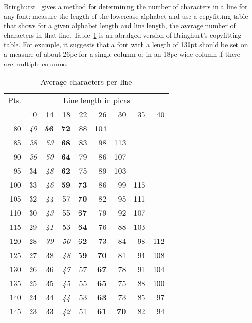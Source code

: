 \documentclass[10pt,letterpaper]{memoir}
\begin{document}
    Bringhurst~\cite{BRINGHURST92} gives a method for determining the number
of characters in a line for any font: 
measure the length of the lowercase
alphabet and use a copyfitting 
table that shows for a given alphabet 
length and line length, the average number of characters in that line.
 Table~\ref{tab:copyfitting} is an
abridged version of Bringhurt's copyfitting table.
For example, it suggests that a font with a length of 130pt should be
set on a measure of about 26pc for a single column or in an 18pc wide
column if there are multiple columns.
 

\begin{table}
\DeleteShortVerb{\|}
\centering
\caption{Average characters per line} \label{tab:copyfitting}
\begin{tabular}{r|rrrrrrrr} \hline
Pts. & \multicolumn{8}{c}{Line length in picas} \\
     & 10 & 14 & 18 & 22 & 26  & 30  & 35 & 40 \\ \hline
80   & \textit{40} & \textbf{56} & \textbf{72} & 88 & 104 &     &    &    \\
85   & \textit{38} & \textit{53} & \textbf{68} & 83 & 98 & 113 &    &    \\
90   & \textit{36} & \textit{50} & \textbf{64} & 79 & 86 & 107 &    &    \\
95   & 34 & \textit{48} & \textbf{62} & 75 & 89 & 103 &    &    \\
100  & 33 & \textit{46} & \textbf{59} & \textbf{73} & 86 & 99 & 116 &   \\
105  & 32 & \textit{44} & 57 & \textbf{70} & 82 & 95 & 111 &   \\
110  & 30 & \textit{43} & 55 & \textbf{67} & 79 & 92 & 107 &   \\
115  & 29 & \textit{41} & 53 & \textbf{64} & 76 & 88 & 103 &   \\
120  & 28 & \textit{39} & \textit{50} & \textbf{62} & 73 & 84 & 98 & 112 \\
125  & 27 & 38 & \textit{48} & \textbf{59} & \textbf{70} & 81 & 94 & 108 \\
130  & 26 & 36 & \textit{47} & 57 & \textbf{67} & 78 & 91 & 104 \\
135  & 25 & 35 & \textit{45} & 55 & \textbf{65} & 75 & 88 & 100 \\
140  & 24 & 34 & \textit{44} & 53 & \textbf{63} & 73 & 85 & 97 \\
145  & 23 & 33 & \textit{42} & 51 & \textbf{61} & \textbf{70} & 82 & 94 \\

\end{tabular}
\end{table}
\end{document}
